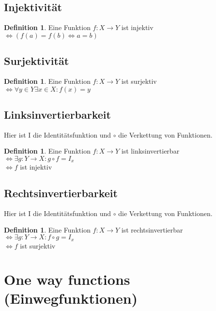 \documentclass[12pt,a4paper]{article}
\theoremstyle{definition}
\newtheorem{definition}[theorem]{Definition}
\begin{document}
    \subsection{Injektivität}

    \begin{definition}
        Eine Funktion $f: X \longrightarrow Y$ ist injektiv \\
        $\Leftrightarrow (f(a) = f(b) \Leftrightarrow a = b)$
    \end{definition}

    \subsection{Surjektivität}

    \begin{definition}
        Eine Funktion $f: X \longrightarrow Y$ ist surjektiv \\
        $\Leftrightarrow \forall y \in Y \exists x \in X: f(x) = y$
    \end{definition}

    \subsection{Linksinvertierbarkeit}
    Hier ist I die Identitätsfunktion und $\circ$ die Verkettung von Funktionen.
    \begin{definition}
        Eine Funktion $f: X \longrightarrow Y$ ist linksinvertierbar \\
        $\Leftrightarrow \exists g: Y \longrightarrow X: g \circ f = I_x$ \\
        $\Leftrightarrow f$ ist injektiv
    \end{definition}

    \subsection{Rechtsinvertierbarkeit}
    Hier ist I die Identitätsfunktion und $\circ$ die Verkettung von Funktionen.
    \begin{definition}
        Eine Funktion $f: X \longrightarrow Y$ ist rechtsinvertierbar \\
        $\Leftrightarrow \exists g: Y \longrightarrow X: f \circ g = I_x$ \\
        $\Leftrightarrow f$ ist surjektiv
    \end{definition}


    \section{One way functions (Einwegfunktionen)}
\end{document}

